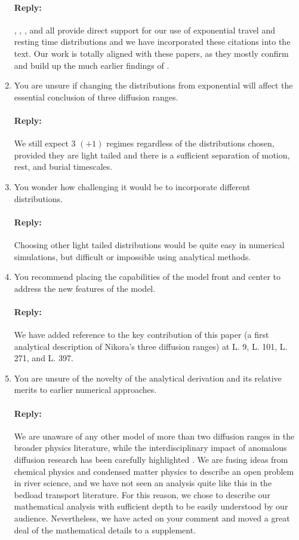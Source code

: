 \documentclass[11pt]{article}
\begin{document}
\begin{enumerate}
\paragraph{Reply:}
\citet{Furbish2012a}, \citet{Roseberry2012}, \citet{Fathel2015}, and \citet{Furbish2016} all provide direct support for our use of exponential travel and resting time distributions and we have incorporated these citations into the text. Our work is totally aligned with these papers, as they mostly confirm and build up the much earlier findings of \citet{Einstein1937}.

\item You are unsure if changing the distributions from exponential will affect the essential conclusion of three diffusion ranges.
\paragraph{Reply:}
We still expect $3$ $(+1)$ regimes regardless of the distributions chosen, provided they are light tailed and there is a sufficient separation of motion, rest, and burial timescales.

\item You wonder how challenging it would be to incorporate different distributions.
\paragraph{Reply:}
Choosing other light tailed distributions would be quite easy in numerical simulations, but difficult or impossible using analytical methods. 

\item You recommend placing the capabilities of the model front and center to address the new features of the model.
\paragraph{Reply:}
We have added reference to the key contribution of this paper (a first analytical description of Nikora's three diffusion ranges) at L. 9, L. 101, L. 271, and L. 397. 


\item You are unsure of the novelty of the analytical derivation and its relative merits to earlier numerical approaches.
\paragraph{Reply:}
We are unaware of any other model of more than two diffusion ranges in the broader physics literature, while the interdisciplinary impact of anomalous diffusion research has been carefully highlighted \citep[e.g.,][]{Sokolov2012,Metzler2014}. We are fusing ideas from chemical physics \citep[e.g.,][]{Schmidt2007} and condensed matter physics \citep[e.g.,][]{Weiss1994} to describe an open problem in river science, and we have not seen an analysis quite like this in the bedload transport literature. For this reason, we chose to describe our mathematical analysis with sufficient depth to be easily understood by our audience.
Nevertheless, we have acted on your comment and moved a great deal of the mathematical details to a supplement.


\end{enumerate}
\end{document}
